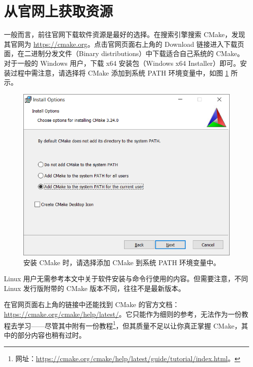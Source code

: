 
\section{从官网上获取资源}

一般而言，前往官网下载软件资源是最好的选择。在搜索引擎搜索 CMake，发现其官网为 \url{https://cmake.org}。点击官网页面右上角的 Download 链接进入下载页面，在二进制分发文件（Binary distributions）中下载适合自己系统的 CMake。对于一般的 Windows 用户，下载 x64 安装包（Windows x64 Installer）即可。安装过程中需注意，请选择将 CMake 添加到系统 PATH 环境变量中，如图 \ref{fig:cmake-installment} 所示。

\begin{figure}[H]
	\centering
	\includegraphics[width=0.6\linewidth]{assets/cmake-installment}
	\caption{安装 CMake 时，请选择添加 CMake 到系统 PATH 环境变量中。}
	\label{fig:cmake-installment}
\end{figure}

Linux 用户无需参考本文中关于软件安装与命令行使用的内容。但需要注意，不同 Linux 发行版附带的 CMake 版本不同，往往不是最新版本。

在官网页面右上角的链接中还能找到 CMake 的官方文档：\url{https://cmake.org/cmake/help/latest/}。它只能作为细则的参考，无法作为一份教程去学习——尽管其中附有一份教程\footnote{网址：\url{https://cmake.org/cmake/help/latest/guide/tutorial/index.html}。}，但其质量不足以让你真正掌握 CMake，其中的部分内容也稍有过时。
